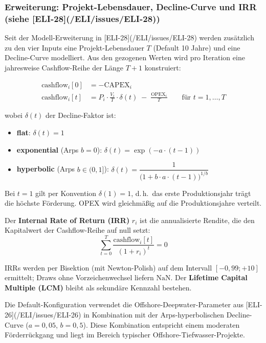 \documentclass[11pt,a4paper]{article}
\begin{document}
\subsubsection*{Erweiterung: Projekt-Lebensdauer, Decline-Curve und IRR (siehe [ELI-28](/ELI/issues/ELI-28))}

Seit der Modell-Erweiterung in [ELI-28](/ELI/issues/ELI-28) werden zusätzlich zu den
vier Inputs eine Projekt-Lebensdauer $T$ (Default 10 Jahre) und eine
Decline-Curve modelliert. Aus den gezogenen Werten wird pro Iteration
eine jahresweise Cashflow-Reihe der Länge $T+1$ konstruiert:

\begin{align}
  \text{cashflow}_i[0] &= -\text{CAPEX}_i \\
  \text{cashflow}_i[t] &= P_i \cdot \frac{V_i}{T} \cdot \delta(t) \;-\; \frac{\text{OPEX}_i}{T}
                          \qquad \text{für } t = 1, \dots, T
\end{align}

wobei $\delta(t)$ der Decline-Faktor ist:
\begin{itemize}[itemsep=1pt]
  \item \textbf{flat}: $\delta(t) = 1$
  \item \textbf{exponential} (Arps $b=0$): $\delta(t) = \exp(-a \cdot (t-1))$
  \item \textbf{hyperbolic} (Arps $b \in (0,1]$):
        $\delta(t) = \dfrac{1}{\bigl(1 + b \cdot a \cdot (t-1)\bigr)^{1/b}}$
\end{itemize}

Bei $t=1$ gilt per Konvention $\delta(1)=1$, d.\,h.\ das erste
Produktionsjahr trägt die höchste Förderung. OPEX wird gleichmäßig auf
die Produktionsjahre verteilt.

Der \textbf{Internal Rate of Return (IRR)} $r_i$ ist die annualisierte
Rendite, die den Kapitalwert der Cashflow-Reihe auf null setzt:
\begin{equation}
  \sum_{t=0}^{T} \frac{\text{cashflow}_i[t]}{(1 + r_i)^{t}} = 0
\end{equation}

IRRs werden per Bisektion (mit Newton-Polish) auf dem Intervall
$[-0{,}99; +10]$ ermittelt; Draws ohne Vorzeichenwechsel liefern
$\text{NaN}$. Der \textbf{Lifetime Capital Multiple (LCM)} bleibt als
sekundäre Kennzahl bestehen.

Die Default-Konfiguration verwendet die Offshore-Deepwater-Parameter aus
[ELI-26](/ELI/issues/ELI-26) in Kombination mit der Arps-hyperbolischen
Decline-Curve ($a=0{,}05$, $b=0{,}5$). Diese Kombination entspricht
einem moderaten Förderrückgang und liegt im Bereich typischer
Offshore-Tiefwasser-Projekte.
\end{document}
